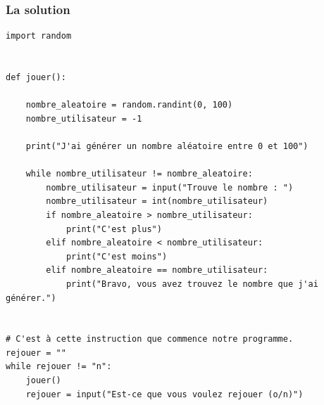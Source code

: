 \documentclass[12pt]{article}
\begin{document}
        \subsubsection{La solution}
        \begin{lstlisting}[style=code, breaklines=false]
import random


def jouer():

    nombre_aleatoire = random.randint(0, 100)
    nombre_utilisateur = -1

    print("J'ai générer un nombre aléatoire entre 0 et 100")

    while nombre_utilisateur != nombre_aleatoire:
        nombre_utilisateur = input("Trouve le nombre : ")
        nombre_utilisateur = int(nombre_utilisateur)
        if nombre_aleatoire > nombre_utilisateur:
            print("C'est plus")
        elif nombre_aleatoire < nombre_utilisateur:
            print("C'est moins")
        elif nombre_aleatoire == nombre_utilisateur:
            print("Bravo, vous avez trouvez le nombre que j'ai générer.")


# C'est à cette instruction que commence notre programme.
rejouer = ""
while rejouer != "n":
    jouer()
    rejouer = input("Est-ce que vous voulez rejouer (o/n)") 
        \end{lstlisting}
\end{document}
